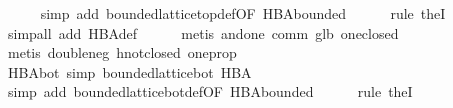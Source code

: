 \begin{isabellebody}
%
\isadelimproof
\ \ \ \ %
\endisadelimproof
%
\isatagproof
{}\isamarkupfalse%
\ {}simp\ add{}\ bounded{}lattice{}top{}def{}OF\ HBA{}bounded{}{}\isanewline
\ \ \ \ \isamarkupfalse%
\ {}rule\ the{}I{}{}\isanewline
\ \ \ \ \isamarkupfalse%
\ {}simp{}all\ add{}\ HBA{}def{}\isanewline
\ \ \ \ \isamarkupfalse%
\ {}metis\ and{}one\ comm\ glb{}\ one{}closed{}\isanewline
\ \ \ \ \isamarkupfalse%
\ {}metis\ double{}neg\ hnot{}closed\ one{}prop{}%
\endisatagproof
{\isafoldproof}%
%
\isadelimproof
\isanewline
%
\endisadelimproof
\isanewline
\ \ \isamarkupfalse%
\ HBA{}bot\ {}simp{}{}\ {}bounded{}lattice{}bot\ HBA\ {}\ {}{}\isanewline
%
\isadelimproof
\ \ \ \ %
\endisadelimproof
%
\isatagproof
{}\isamarkupfalse%
\ {}simp\ add{}\ bounded{}lattice{}bot{}def{}OF\ HBA{}bounded{}{}\isanewline
\ \ \ \ \isamarkupfalse%
\ {}rule\ the{}I{}{}\isanewline
\ \ \ \ \isamarkupfalse%

\end{isabellebody}
